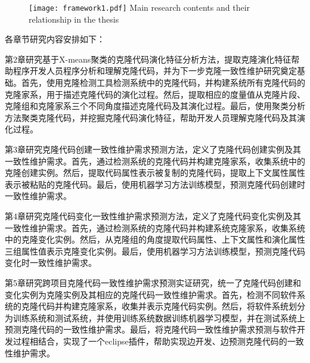 
\begin{figure}[htbp]
\centering
\texttt{[image: framework1.pdf]}
{Main research contents and their relationship in the thesis}
\vspace{-1em}
\end{figure}


各章节研究内容安排如下：

第2章研究基于X-means聚类的克隆代码演化特征分析方法，提取克隆演化特征帮助程序开发人员程序分析和理解克隆代码，并为下一步克隆一致性维护研究奠定基础。首先，使用克隆检测工具检测系统中的克隆代码，并构建系统所有克隆代码的克隆家系，用于描述克隆代码的演化过程。然后，提取相应的度量值从克隆片段、克隆组和克隆家系三个不同角度描述克隆代码及其演化过程。最后，使用聚类分析方法聚类克隆代码，并挖掘克隆代码演化特征，帮助开发人员理解克隆代码及其演化过程。

第3章研究克隆代码创建一致性维护需求预测方法，定义了克隆代码创建实例及其一致性维护需求。首先，通过检测系统的克隆代码并构建克隆家系，收集系统中的克隆创建实例。然后，提取代码属性表示被复制的克隆代码，提取上下文属性属性表示被粘贴的克隆代码。最后，使用机器学习方法训练模型，预测克隆代码创建时一致性维护需求。

第4章研究克隆代码变化一致性维护需求预测方法，定义了克隆代码变化实例及其一致性维护需求。首先，通过检测系统的克隆代码并构建系统克隆家系，收集系统中的克隆变化实例。然后，从克隆组的角度提取代码属性、上下文属性和演化属性三组属性值表示克隆变化实例。最后，使用机器学习方法训练模型，预测克隆代码变化时一致性维护需求。

第5章研究跨项目克隆代码一致性维护需求预测实证研究，统一了克隆代码创建和变化实例为克隆实例及其相应的克隆代码一致性维护需求。首先，检测不同软件系统的克隆代码并构建克隆家系，收集并表示克隆代码实例。然后，将软件系统划分为训练系统和测试系统，并使用训练系统数据训练机器学习模型，并在测试系统上预测克隆代码的一致性维护需求。最后，将克隆代码一致性维护需求预测与软件开发过程相结合，实现了一个eclipse插件，帮助实现边开发、边预测克隆代码的一致性维护需求。
